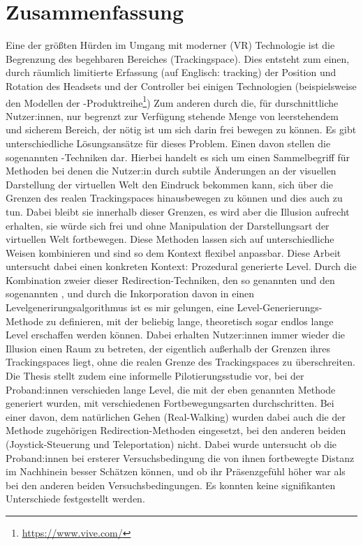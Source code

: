 \chapter*{Zusammenfassung}
Eine der größten Hürden im Umgang mit moderner  (VR) Technologie ist die Begrenzung des begehbaren Bereiches (Trackingspace).
Dies entsteht zum einen, durch räumlich limitierte Erfassung (auf Englisch: tracking) der Position und Rotation des Headsets und der Controller bei einigen Technologien (beispielsweise den Modellen der -Produktreihe\footnote{\href{https://www.vive.com/}{https://www.vive.com/}})
Zum anderen durch die, für durschnittliche Nutzer:innen, nur begrenzt zur Verfügung stehende Menge von leerstehendem und sicherem Bereich, der nötig ist um sich darin frei bewegen zu können.
Es gibt unterschiedliche Lösungsansätze für dieses Problem.
Einen davon stellen die sogenannten -Techniken dar.
Hierbei handelt es sich um einen Sammelbegriff für Methoden bei denen die Nutzer:in durch subtile Änderungen an der visuellen Darstellung der virtuellen Welt den Eindruck bekommen kann, sich über die Grenzen des realen Trackingspaces hinausbewegen zu können und dies auch zu tun. Dabei bleibt sie innerhalb dieser Grenzen, es wird aber die Illusion aufrecht erhalten, sie würde sich frei und ohne Manipulation der Darstellungsart der virtuellen Welt fortbewegen. Diese Methoden lassen sich auf unterschiedliche Weisen kombinieren und sind so dem Kontext flexibel anpassbar.
Diese Arbeit untersucht dabei einen konkreten Kontext: Prozedural generierte Level. Durch die Kombination zweier dieser Redirection-Techniken, den so genannten  und den sogenannten , und durch die Inkorporation davon in einen Levelgenerirungsalgorithmus ist es mir gelungen, eine Level-Generierungs-Methode zu definieren, mit der beliebig lange, theoretisch sogar endlos lange Level erschaffen werden können. Dabei erhalten Nutzer:innen immer wieder die Illusion einen Raum zu betreten, der eigentlich außerhalb der Grenzen ihres Trackingspaces liegt, ohne die realen Grenze des Trackingspaces zu überschreiten.
Die Thesis stellt zudem eine informelle Pilotierungsstudie vor, bei der Proband:innen verschieden lange Level, die mit der eben genannten Methode generiert wurden, mit verschiedenen Fortbewegungsarten durchschritten. Bei einer davon, dem natürlichen Gehen (Real-Walking) wurden dabei auch die der Methode zugehörigen Redirection-Methoden eingesetzt, bei den anderen beiden (Joystick-Steuerung und Teleportation) nicht. Dabei wurde untersucht ob die Proband:innen bei ersterer Versuchsbedingung die von ihnen fortbewegte Distanz im Nachhinein besser Schätzen können, und ob ihr Präsenzgefühl höher war als bei den anderen beiden Versuchsbedingungen. Es konnten keine signifikanten Unterschiede festgestellt werden.

